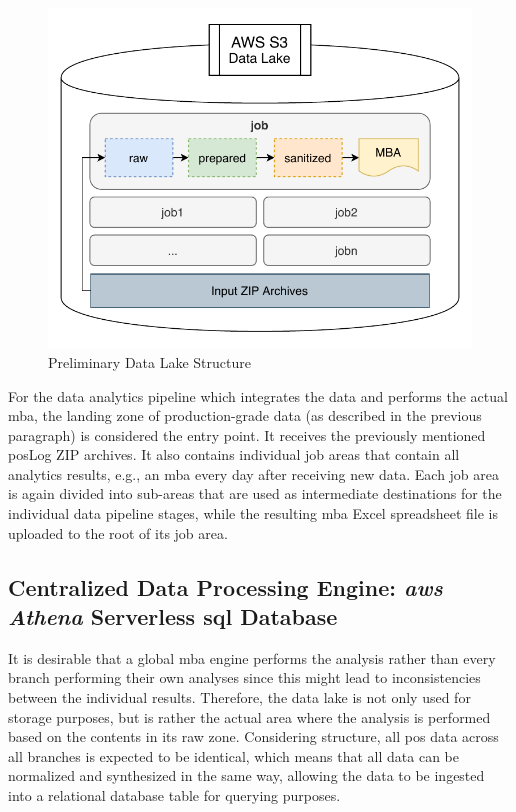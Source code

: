\newpage

\begin{figure}[h!]
	\centering
	\includegraphics[width=0.67\linewidth]{main-matter/img/3-data-lake.pdf}
	\caption{Preliminary Data Lake Structure}
	\label{fig:3-data-lake}
\end{figure}

For the data analytics pipeline which integrates the data and performs the actual \ac{mba}, the landing zone of production-grade data (as described in the previous paragraph) is considered the entry point. It receives the previously mentioned \ac{pos}Log ZIP archives. It also contains individual job areas that contain all analytics results, e.g., an \ac{mba} every day after receiving new data. Each job area is again divided into sub-areas that are used as intermediate destinations for the individual data pipeline stages, while the resulting \ac{mba} Excel spreadsheet file is uploaded to the root of its job area.

\subsection{Centralized Data Processing Engine: \textit{\acs{aws} Athena} Serverless \acs{sql} Database}

It is desirable that a global \ac{mba} engine performs the analysis rather than every branch performing their own analyses since this might lead to inconsistencies between the individual results. Therefore, the data lake is not only used for storage purposes, but is rather the actual area where the analysis is performed based on the contents in its raw zone. Considering structure, all \ac{pos} data across all branches is expected to be identical, which means that all data can be normalized and synthesized in the same way, allowing the data to be ingested into a relational database table for querying purposes.

